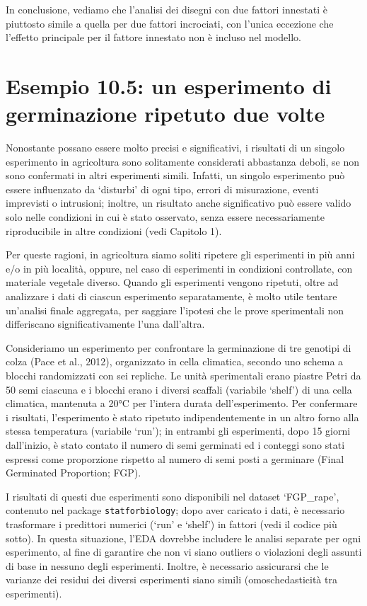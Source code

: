 \documentclass[
  12pt,
]{book}
\begin{document}
In conclusione, vediamo che l'analisi dei disegni con due fattori innestati è piuttosto simile a quella per due fattori incrociati, con l'unica eccezione che l'effetto principale per il fattore innestato non è incluso nel modello.

\hypertarget{esempio-10.5-un-esperimento-di-germinazione-ripetuto-due-volte}{%
\section{Esempio 10.5: un esperimento di germinazione ripetuto due volte}\label{esempio-10.5-un-esperimento-di-germinazione-ripetuto-due-volte}}

Nonostante possano essere molto precisi e significativi, i risultati di un singolo esperimento in agricoltura sono solitamente considerati abbastanza deboli, se non sono confermati in altri esperimenti simili. Infatti, un singolo esperimento può essere influenzato da `disturbi' di ogni tipo, errori di misurazione, eventi imprevisti o intrusioni; inoltre, un risultato anche significativo può essere valido solo nelle condizioni in cui è stato osservato, senza essere necessariamente riproducibile in altre condizioni (vedi Capitolo 1).

Per queste ragioni, in agricoltura siamo soliti ripetere gli esperimenti in più anni e/o in più località, oppure, nel caso di esperimenti in condizioni controllate, con materiale vegetale diverso. Quando gli esperimenti vengono ripetuti, oltre ad analizzare i dati di ciascun esperimento separatamente, è molto utile tentare un'analisi finale aggregata, per saggiare l'ipotesi che le prove sperimentali non differiscano significativamente l'una dall'altra.

Consideriamo un esperimento per confrontare la germinazione di tre genotipi di colza (Pace et al., 2012), organizzato in cella climatica, secondo uno schema a blocchi randomizzati con sei repliche. Le unità sperimentali erano piastre Petri da 50 semi ciascuna e i blocchi erano i diversi scaffali (variabile `shelf') di una cella climatica, mantenuta a 20°C per l'intera durata dell'esperimento. Per confermare i risultati, l'esperimento è stato ripetuto indipendentemente in un altro forno alla stessa temperatura (variabile `run'); in entrambi gli esperimenti, dopo 15 giorni dall'inizio, è stato contato il numero di semi germinati ed i conteggi sono stati espressi come proporzione rispetto al numero di semi posti a germinare (Final Germinated Proportion; FGP).

I risultati di questi due esperimenti sono disponibili nel dataset `FGP\_rape', contenuto nel package \texttt{statforbiology}; dopo aver caricato i dati, è necessario trasformare i predittori numerici (`run' e `shelf') in fattori (vedi il codice più sotto). In questa situazione, l'EDA dovrebbe includere le analisi separate per ogni esperimento, al fine di garantire che non vi siano outliers o violazioni degli assunti di base in nessuno degli esperimenti. Inoltre, è necessario assicurarsi che le varianze dei residui dei diversi esperimenti siano simili (omoschedasticità tra esperimenti).
\end{document}
